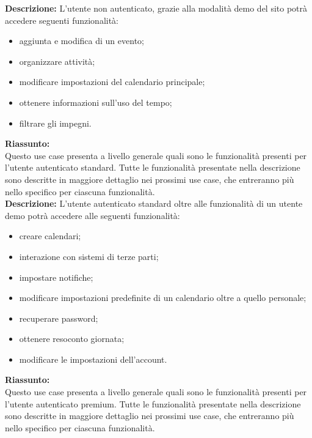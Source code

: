 \begin{listaPersonale}[UC]{}
\begin{listaPersonale2} [UC] {}
        \textbf{Descrizione:}
        L'utente non autenticato, grazie alla modalità demo del sito potrà accedere seguenti funzionalità:
        \begin{itemize}
            \item aggiunta e modifica di un evento;
            \item organizzare attività;
            \item modificare impostazioni del calendario principale;
            \item ottenere informazioni sull'uso del tempo;
            \item filtrare gli impegni.
        \end{itemize}

        \textbf{Riassunto:} \\
        Questo use case presenta a livello generale quali sono le funzionalità presenti per l'utente autenticato standard. Tutte le funzionalità presentate nella descrizione sono descritte in maggiore dettaglio nei prossimi use case, che entreranno più nello specifico per ciascuna funzionalità. \\
        \textbf{Descrizione:}
        L'utente autenticato standard oltre alle funzionalità di un utente demo potrà accedere alle seguenti funzionalità:
        \begin{itemize}
            \item creare calendari;
            \item interazione con sistemi di terze parti;
            \item impostare notifiche;
            \item modificare impostazioni predefinite di un calendario oltre a quello personale;
            \item recuperare password;
            \item ottenere resoconto giornata;
            \item modificare le impostazioni dell'account.
        \end{itemize}
        \textbf{Riassunto:} \\
        Questo use case presenta a livello generale quali sono le funzionalità presenti per l'utente autenticato premium. Tutte le funzionalità presentate nella descrizione sono descritte in maggiore dettaglio nei prossimi use case, che entreranno più nello specifico per ciascuna funzionalità. \\

\end{listaPersonale2}
\end{listaPersonale}

